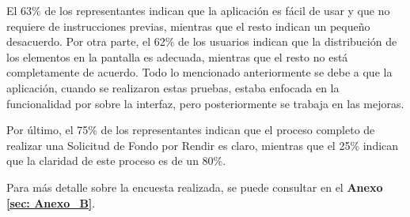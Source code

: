 El 63\% de los representantes indican que la aplicación es fácil de usar y que no requiere de instrucciones previas, mientras que el resto indican un pequeño desacuerdo. Por otra parte, el 62\% de los usuarios indican que la distribución de los elementos en la pantalla es adecuada, mientras que el resto no está completamente de acuerdo. Todo lo mencionado anteriormente se debe a que la aplicación, cuando se realizaron estas pruebas, estaba enfocada en la funcionalidad por sobre la interfaz, pero posteriormente se trabaja en las mejoras.

Por último, el 75\% de los representantes indican que el proceso completo de realizar una Solicitud de Fondo por Rendir es claro, mientras que el 25\% indican que la claridad de este proceso es de un 80\%.

Para más detalle sobre la encuesta realizada, se puede consultar en el \textbf{Anexo \ref{sec: Anexo_B}}.